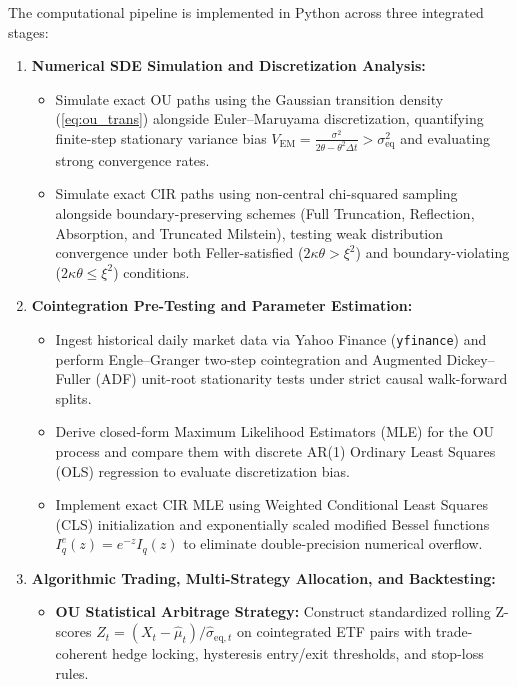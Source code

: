\documentclass[11pt,a4paper]{article}
\begin{document}
The computational pipeline is implemented in Python across three integrated stages:
\begin{enumerate}
    \item \textbf{Numerical SDE Simulation and Discretization Analysis:}
    \begin{itemize}
        \item Simulate exact OU paths using the Gaussian transition density (\ref{eq:ou_trans}) alongside Euler--Maruyama discretization, quantifying finite-step stationary variance bias $V_{\mathrm{EM}} = \frac{\sigma^2}{2\theta - \theta^2\Delta t} > \sigma_{\mathrm{eq}}^2$ and evaluating strong convergence rates.
        \item Simulate exact CIR paths using non-central chi-squared sampling alongside boundary-preserving schemes (Full Truncation, Reflection, Absorption, and Truncated Milstein), testing weak distribution convergence under both Feller-satisfied ($2\kappa\theta > \xi^2$) and boundary-violating ($2\kappa\theta \le \xi^2$) conditions.
    \end{itemize}
    \item \textbf{Cointegration Pre-Testing and Parameter Estimation:}
    \begin{itemize}
        \item Ingest historical daily market data via Yahoo Finance (\texttt{yfinance}) and perform Engle--Granger two-step cointegration and Augmented Dickey--Fuller (ADF) unit-root stationarity tests under strict causal walk-forward splits.
        \item Derive closed-form Maximum Likelihood Estimators (MLE) for the OU process and compare them with discrete AR(1) Ordinary Least Squares (OLS) regression to evaluate discretization bias.
        \item Implement exact CIR MLE using Weighted Conditional Least Squares (CLS) initialization and exponentially scaled modified Bessel functions $I_q^e(z) = e^{-z}I_q(z)$ to eliminate double-precision numerical overflow.
    \end{itemize}
    \item \textbf{Algorithmic Trading, Multi-Strategy Allocation, and Backtesting:}
    \begin{itemize}
        \item \textbf{OU Statistical Arbitrage Strategy:} Construct standardized rolling Z-scores $Z_t = (X_t - \hat{\mu}_t)/\hat{\sigma}_{\mathrm{eq},t}$ on cointegrated ETF pairs with trade-coherent hedge locking, hysteresis entry/exit thresholds, and stop-loss rules.

\end{itemize}
\end{enumerate}
\end{document}
